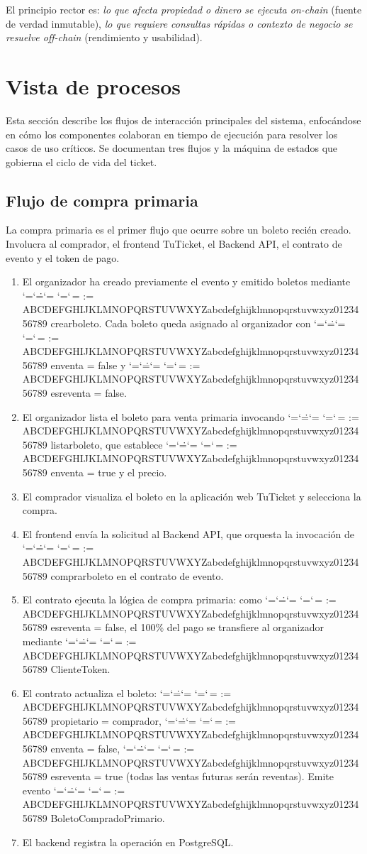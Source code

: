 \documentclass[12pt,oneside]{article}
\makeatletter
\def\ttbreak@uscore{\char95\penalty0\hskip0pt\relax}%
\def\ttbreak@actcat#1{\catcode`#1=\active}%
\def\ttbreak@chars{%
  \catcode`\/=\active \catcode`\.=\active \catcode`\:=\active
  \catcode`\-=\active \catcode`\,=\active
  \@tfor\ttbreak@c:=%
ABCDEFGHIJKLMNOPQRSTUVWXYZabcdefghijklmnopqrstuvwxyz0123456789\do{%
    \expandafter\ttbreak@actcat\ttbreak@c}%
  \let\_\ttbreak@uscore}%
\DeclareRobustCommand{\texttt}{\begingroup\ttfamily\ttbreak@chars\ttbreak@grab}
\def\ttbreak@grab#1{#1\endgroup}
\makeatother
\begin{document}
El principio rector es: \textit{lo que afecta propiedad o dinero se ejecuta on-chain} (fuente de verdad inmutable), \textit{lo que requiere consultas rápidas o contexto de negocio se resuelve off-chain} (rendimiento y usabilidad).

\FloatBarrier
\clearpage
\section{Vista de procesos}
\label{sec:vista-procesos}

Esta sección describe los flujos de interacción principales del sistema, enfocándose en cómo los componentes colaboran en tiempo de ejecución para resolver los casos de uso críticos. Se documentan tres flujos y la máquina de estados que gobierna el ciclo de vida del ticket.

\subsection{Flujo de compra primaria}

La compra primaria es el primer flujo que ocurre sobre un boleto recién creado. Involucra al comprador, el frontend TuTicket, el Backend API, el contrato de evento y el token de pago.

\begin{enumerate}
  \item El organizador ha creado previamente el evento y emitido boletos mediante \texttt{crear\_boleto}. Cada boleto queda asignado al organizador con \texttt{en\_venta = false} y \texttt{es\_reventa = false}.
  \item El organizador lista el boleto para venta primaria invocando \texttt{listar\_boleto}, que establece \texttt{en\_venta = true} y el precio.
  \item El comprador visualiza el boleto en la aplicación web TuTicket y selecciona la compra.
  \item El frontend envía la solicitud al Backend API, que orquesta la invocación de \texttt{comprar\_boleto} en el contrato de evento.
  \item El contrato ejecuta la lógica de compra primaria: como \texttt{es\_reventa = false}, el 100\% del pago se transfiere al organizador mediante \texttt{ClienteToken}.
  \item El contrato actualiza el boleto: \texttt{propietario = comprador}, \texttt{en\_venta = false}, \texttt{es\_reventa = true} (todas las ventas futuras serán reventas). Emite evento \texttt{BoletoCompradoPrimario}.
  \item El backend registra la operación en PostgreSQL.
\end{enumerate}
\end{document}
